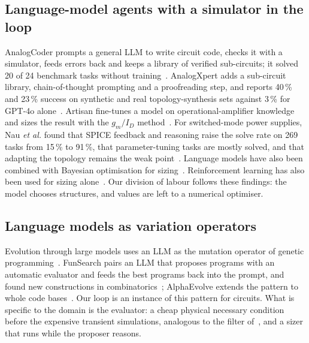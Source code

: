 \documentclass[journal]{IEEEtran}
\begin{document}
\subsection{Language-model agents with a simulator in the loop}
AnalogCoder prompts a general LLM to write circuit code, checks it with a simulator, feeds errors back and
keeps a library of verified sub-circuits; it solved 20 of 24 benchmark tasks without
training~\cite{lai2025analogcoder}. AnalogXpert adds a sub-circuit library, chain-of-thought prompting
and a proofreading step, and reports 40\,\% and 23\,\% success on synthetic and real topology-synthesis
sets against 3\,\% for GPT-4o alone~\cite{zhang2024analogxpert}. Artisan fine-tunes a model on
operational-amplifier knowledge and sizes the result with the $g_m/I_D$ method~\cite{chen2024artisan}.
For switched-mode power supplies, Nau \emph{et al.} found that SPICE feedback and reasoning raise the solve
rate on 269 tasks from 15\,\% to 91\,\%, that parameter-tuning tasks are mostly solved, and that adapting
the topology remains the weak point~\cite{nau2025smps}. Language models have also been combined with
Bayesian optimisation for sizing~\cite{yin2024adollm}. Reinforcement learning has also been used for sizing alone~\cite{settaluri2020autockt}. Our division of labour follows these findings: the
model chooses structures, and values are left to a numerical optimiser.

\subsection{Language models as variation operators}
Evolution through large models uses an LLM as the mutation operator of genetic
programming~\cite{lehman2022elm}. FunSearch pairs an LLM that proposes programs with an automatic
evaluator and feeds the best programs back into the prompt, and found new constructions in
combinatorics~\cite{romera2024funsearch}; AlphaEvolve extends the pattern to whole
code bases~\cite{novikov2025alphaevolve}. Our loop is an instance of this pattern for circuits. What is
specific to the domain is the evaluator: a cheap physical necessary condition before the expensive
transient simulations, analogous to the filter of~\cite{zhao2022drl}, and a sizer that runs while the
proposer reasons.
\end{document}
